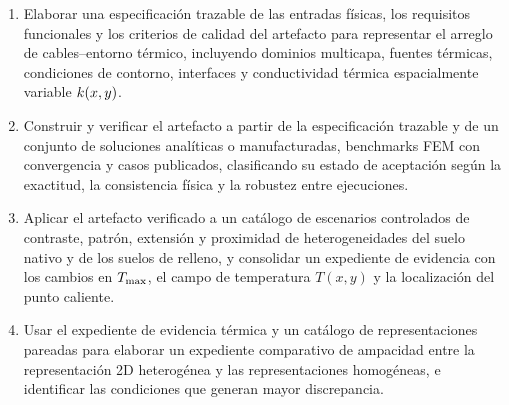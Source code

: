 \begin{enumerate}[label=OE\arabic*.]
  \item Elaborar una especificación trazable de las entradas físicas, los requisitos funcionales y los criterios de calidad del artefacto para representar el arreglo de cables--entorno térmico, incluyendo dominios multicapa, fuentes térmicas, condiciones de contorno, interfaces y conductividad térmica espacialmente variable $k(x,y)$.
  \item Construir y verificar el artefacto a partir de la especificación trazable y de un conjunto de soluciones analíticas o manufacturadas, benchmarks FEM con convergencia y casos publicados, clasificando su estado de aceptación según la exactitud, la consistencia física y la robustez entre ejecuciones.
  \item Aplicar el artefacto verificado a un catálogo de escenarios controlados de contraste, patrón, extensión y proximidad de heterogeneidades del suelo nativo y de los suelos de relleno, y consolidar un expediente de evidencia con los cambios en $T_{\max}$, el campo de temperatura $T(x,y)$ y la localización del punto caliente.
  \item Usar el expediente de evidencia térmica y un catálogo de representaciones pareadas para elaborar un expediente comparativo de ampacidad entre la representación 2D heterogénea y las representaciones homogéneas, e identificar las condiciones que generan mayor discrepancia.
\end{enumerate}

